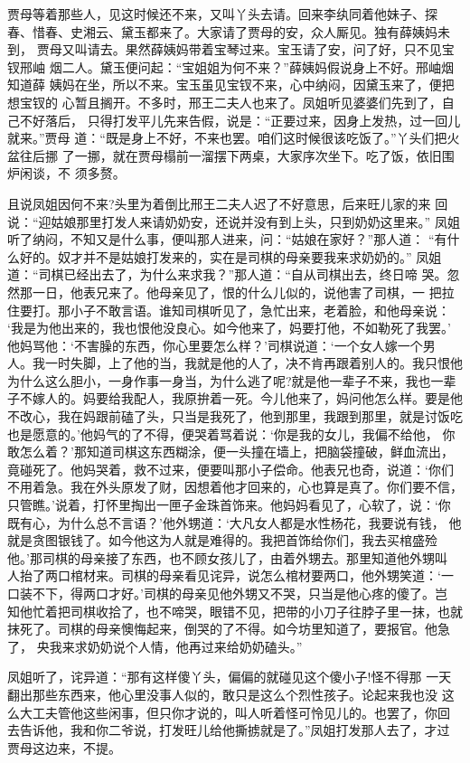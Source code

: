 贾母等着那些人，见这时候还不来，又叫丫头去请。回来李纨同着他妹子、探
春、惜春、史湘云、黛玉都来了。大家请了贾母的安，众人厮见。独有薛姨妈未到，
贾母又叫请去。果然薛姨妈带着宝琴过来。宝玉请了安，问了好，只不见宝钗邢岫
烟二人。黛玉便问起：“宝姐姐为何不来？”薛姨妈假说身上不好。邢岫烟知道薛
姨妈在坐，所以不来。宝玉虽见宝钗不来，心中纳闷，因黛玉来了，便把想宝钗的
心暂且搁开。不多时，邢王二夫人也来了。凤姐听见婆婆们先到了，自己不好落后，
只得打发平儿先来告假，说是：“正要过来，因身上发热，过一回儿就来。”贾母
道：“既是身上不好，不来也罢。咱们这时候很该吃饭了。”丫头们把火盆往后挪
了一挪，就在贾母榻前一溜摆下两桌，大家序次坐下。吃了饭，依旧围炉闲谈，不
须多赘。

且说凤姐因何不来?头里为着倒比邢王二夫人迟了不好意思，后来旺儿家的来
回说：“迎姑娘那里打发人来请奶奶安，还说并没有到上头，只到奶奶这里来。”
凤姐听了纳闷，不知又是什么事，便叫那人进来，问：“姑娘在家好？”那人道：
“有什么好的。奴才并不是姑娘打发来的，实在是司棋的母亲要我来求奶奶的。”
凤姐道：“司棋已经出去了，为什么来求我？”那人道：“自从司棋出去，终日啼
哭。忽然那一日，他表兄来了。他母亲见了，恨的什么儿似的，说他害了司棋，一
把拉住要打。那小子不敢言语。谁知司棋听见了，急忙出来，老着脸，和他母亲说：
‘我是为他出来的，我也恨他没良心。如今他来了，妈要打他，不如勒死了我罢。’
他妈骂他：‘不害臊的东西，你心里要怎么样？’司棋说道：‘一个女人嫁一个男
人。我一时失脚，上了他的当，我就是他的人了，决不肯再跟着别人的。我只恨他
为什么这么胆小，一身作事一身当，为什么逃了呢?就是他一辈子不来，我也一辈
子不嫁人的。妈要给我配人，我原拚着一死。今儿他来了，妈问他怎么样。要是他
不改心，我在妈跟前磕了头，只当是我死了，他到那里，我跟到那里，就是讨饭吃
也是愿意的。’他妈气的了不得，便哭着骂着说：‘你是我的女儿，我偏不给他，
你敢怎么着？’那知道司棋这东西糊涂，便一头撞在墙上，把脑袋撞破，鲜血流出，
竟碰死了。他妈哭着，救不过来，便要叫那小子偿命。他表兄也奇，说道：‘你们
不用着急。我在外头原发了财，因想着他才回来的，心也算是真了。你们要不信，
只管瞧。’说着，打怀里掏出一匣子金珠首饰来。他妈妈看见了，心软了，说：‘你
既有心，为什么总不言语？’他外甥道：‘大凡女人都是水性杨花，我要说有钱，
他就是贪图银钱了。如今他这为人就是难得的。我把首饰给你们，我去买棺盛殓
他。’那司棋的母亲接了东西，也不顾女孩儿了，由着外甥去。那里知道他外甥叫
人抬了两口棺材来。司棋的母亲看见诧异，说怎么棺材要两口，他外甥笑道：‘一
口装不下，得两口才好。’司棋的母亲见他外甥又不哭，只当是他心疼的傻了。岂
知他忙着把司棋收拾了，也不啼哭，眼错不见，把带的小刀子往脖子里一抹，也就
抹死了。司棋的母亲懊悔起来，倒哭的了不得。如今坊里知道了，要报官。他急了，
央我来求奶奶说个人情，他再过来给奶奶磕头。”

凤姐听了，诧异道：“那有这样傻丫头，偏偏的就碰见这个傻小子!怪不得那
一天翻出那些东西来，他心里没事人似的，敢只是这么个烈性孩子。论起来我也没
这么大工夫管他这些闲事，但只你才说的，叫人听着怪可怜见儿的。也罢了，你回
去告诉他，我和你二爷说，打发旺儿给他撕掳就是了。”凤姐打发那人去了，才过
贾母这边来，不提。


